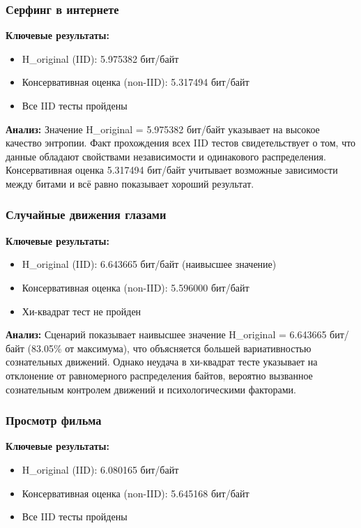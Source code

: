 \documentclass[14pt, a4paper]{extreport}
\begin{document}
\subsubsection{Серфинг в интернете}

\textbf{Ключевые результаты:}
\begin{itemize}
    \item H\_original (IID): 5.975382 бит/байт
    \item Консервативная оценка (non-IID): 5.317494 бит/байт
    \item Все IID тесты пройдены
\end{itemize}

\textbf{Анализ:} Значение H\_original = 5.975382 бит/байт указывает на высокое качество энтропии. Факт прохождения всех IID тестов свидетельствует о том, что данные обладают свойствами независимости и одинакового распределения. Консервативная оценка 5.317494 бит/байт учитывает возможные зависимости между битами и всё равно показывает хороший результат.

\subsubsection{Случайные движения глазами}

\textbf{Ключевые результаты:}
\begin{itemize}
    \item H\_original (IID): 6.643665 бит/байт (наивысшее значение)
    \item Консервативная оценка (non-IID): 5.596000 бит/байт
    \item Хи-квадрат тест не пройден
\end{itemize}

\textbf{Анализ:} Сценарий показывает наивысшее значение H\_original = 6.643665 бит/байт (83.05\% от максимума), что объясняется большей вариативностью сознательных движений. Однако неудача в хи-квадрат тесте указывает на отклонение от равномерного распределения байтов, вероятно вызванное сознательным контролем движений и психологическими факторами.

\subsubsection{Просмотр фильма}

\textbf{Ключевые результаты:}
\begin{itemize}
    \item H\_original (IID): 6.080165 бит/байт
    \item Консервативная оценка (non-IID): 5.645168 бит/байт
    \item Все IID тесты пройдены
\end{itemize}
\end{document}
